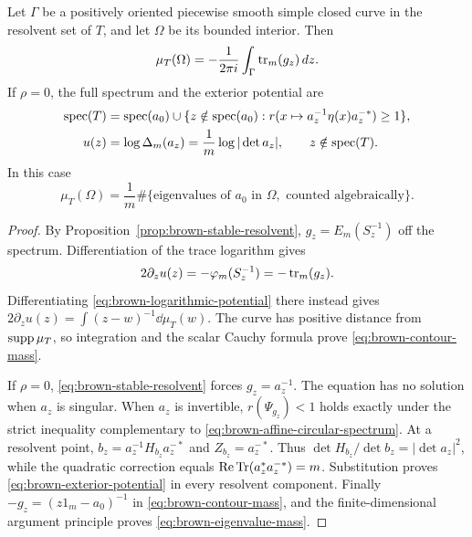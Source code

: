 \begin{corollary}\label{prop:brown-contour-mass}
Let $\Gamma$ be a positively oriented piecewise smooth simple closed curve in the resolvent set of $T$, and let $\Omega$ be its bounded interior.
Then
\begin{equation}\label{eq:brown-contour-mass}
 \mu_T(\Omega)=-\frac1{2\pi i}\int_\Gamma\operatorname{tr}_m(g_z)\,d z.
\end{equation}
If $\rho=0$, the full spectrum and the exterior potential are
\begin{align}
 \operatorname{spec}(T)&=\operatorname{spec}(a_0)\cup
 \{z\notin\operatorname{spec}(a_0):r(x\mapsto a_z^{-1}\eta(x)a_z^{-*})\ge1\},
                                  \label{eq:brown-affine-circular-spectrum}\\
 u(z)&=\log\Delta_m(a_z)
       =\frac1m\log|\det a_z|,
 \qquad z\notin\operatorname{spec}(T).          \label{eq:brown-exterior-potential}
\end{align}
In this case
\begin{equation}\label{eq:brown-eigenvalue-mass}
 \mu_T(\Omega)=\frac1m
   \#\{\text{eigenvalues of }a_0\text{ in }\Omega,
                        \text{ counted algebraically}\}.
\end{equation}
\end{corollary}
\begin{proof}
By Proposition~\ref{prop:brown-stable-resolvent}, $g_z=E_m(S_z^{-1})$ off the spectrum.
Differentiation of the trace logarithm gives
\[
 2\partial_z u(z)=-\varphi_m(S_z^{-1})=-\operatorname{tr}_m(g_z).
\]
Differentiating \eqref{eq:brown-logarithmic-potential} there instead gives $2\partial_z u(z)=\int(z-w)^{-1}\dd\mu_T(w)$.
The curve has positive distance from $\operatorname{supp}\mu_T$, so integration and the scalar Cauchy formula prove \eqref{eq:brown-contour-mass}.

If $\rho=0$, \eqref{eq:brown-stable-resolvent} forces $g_z=a_z^{-1}$.
The equation has no solution when $a_z$ is singular.
When $a_z$ is invertible, $r(\Psi_{g_z})<1$ holds exactly under the strict inequality complementary to \eqref{eq:brown-affine-circular-spectrum}.
At a resolvent point, $b_z=a_z^{-1}H_{b_z}a_z^{-*}$ and $Z_{b_z}=a_z^{-*}$.
Thus $\det H_{b_z}/\det b_z=|\det a_z|^2$, while the quadratic correction equals $\operatorname{Re}\operatorname{Tr}(a_z^*a_z^{-*})=m$.
Substitution proves \eqref{eq:brown-exterior-potential} in every resolvent component.
Finally $-g_z=(z1_m-a_0)^{-1}$ in \eqref{eq:brown-contour-mass}, and the finite-dimensional argument principle proves \eqref{eq:brown-eigenvalue-mass}.
\end{proof}

